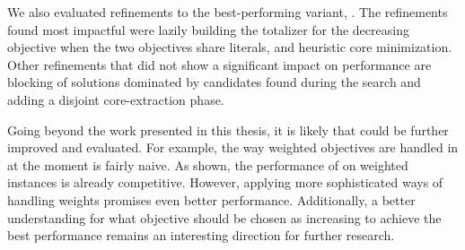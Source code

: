 We also evaluated refinements to the best-performing variant, \msh{}.
The refinements found most impactful were lazily building the totalizer for the decreasing objective when the two objectives share literals, and heuristic core minimization.
Other refinements that did not show a significant impact on performance are blocking of solutions dominated by candidates found during the search and adding a disjoint core-extraction phase.

Going beyond the work presented in this thesis, it is likely that \algname{} could be further improved and evaluated.
For example, the way weighted objectives are handled in \algname{} at the moment is fairly naive.
As shown, the performance of \algname{} on weighted instances is already competitive.
However, applying more sophisticated ways of handling weights promises even better performance.
Additionally, a better understanding for what objective should be chosen as increasing to achieve the best performance remains an interesting direction for further research.